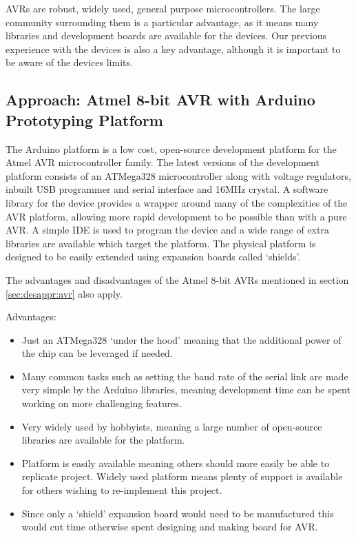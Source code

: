 AVRs are robust, widely used, general purpose microcontrollers. The large community surrounding them is a particular advantage, as it means many libraries and development boards are available for the devices. Our previous experience with the devices is also a key advantage, although it is important to be aware of the devices limits.


\subsection{Approach: Atmel 8-bit AVR with Arduino Prototyping Platform}
\label{sec:appr_considered_arduino}

The Arduino platform is a low cost, open-source development platform for the Atmel AVR microcontroller family. The latest versions of the development platform consists of an ATMega328 microcontroller along with voltage regulators, inbuilt USB programmer and serial interface and 16MHz crystal. A software library for the device provides a wrapper around many of the complexities of the AVR platform, allowing more rapid development to be possible than with a pure AVR. A simple IDE is used to program the device and a wide range of extra libraries are available which target the platform. The physical platform is designed to be easily extended using expansion boards called `shields'.

The advantages and disadvantages of the Atmel 8-bit AVRs mentioned in section \ref{sec:desappr:avr} also apply.

Advantages:
\begin{itemize}
\item Just an ATMega328 `under the hood' meaning that the additional power of the chip can be leveraged if needed.

\item Many common tasks such as setting the baud rate of the serial link are made very simple by the Arduino libraries, meaning development time can be spent working on more challenging features.

\item Very widely used by hobbyists, meaning a large number of open-source libraries are available for the platform.

\item Platform is easily available meaning others should more easily be able to replicate project. Widely used platform means plenty of support is available for others wishing to re-implement this project.

\item Since only a `shield' expansion board would need to be manufactured this would cut time otherwise spent designing and making board for AVR.
\end{itemize}

